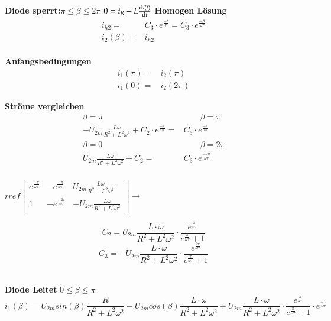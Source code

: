 \textbf{Diode sperrt:}$ \pi \leq \beta \leq 2\pi$\newline
$0 = i_R + L\frac{\mathop{}\!\mathrm{d} i(t)}{\mathop{}\!\mathrm{d} t}$\newline
\textbf{Homogen Lösung}
\begin{align*}
i_{h2} = & C_3 \cdot e^{\frac{-t}{\tau}} = C_3 \cdot e^{\frac{-\beta}{\omega \tau}}\\
i_2(\beta) = & i_{h2}
\end{align*}
\\
\textbf{Anfangsbedingungen}
\begin{align*}
    i_1(\pi) = & i_2(\pi)\\
    i_1(0)  = & i_2(2\pi)
\end{align*}

\textbf{Ströme vergleichen}
\begin{align*}
    \beta = \pi \qquad & \qquad \beta = \pi\\
    - U_{2m} \frac{L\omega}{R^2 + L^2\omega^2} + C_2 \cdot e^{\frac{-\pi}{\omega \tau}} = & C_3 \cdot e^{\frac{-\pi}{\omega \tau}}\\
    \beta = 0 \qquad & \qquad \beta = 2\pi\\
    U_{2m} \frac{L\omega}{R^2 + L^2\omega^2} + C_2  = & C_3 \cdot e^{\frac{-2\pi}{\omega \tau}}\\  
\end{align*}
\begin{minipage}{7cm}
    $rref
    \begin{bmatrix}
    e^{\frac{-\pi}{\omega \tau}}       &-e^{\frac{-\pi}{\omega \tau}}  & U_{2m} \frac{L\omega}{R^2 + L^2\omega^2} \\ 
    1& -e^{\frac{-2\pi}{\omega \tau}}         & -U_{2m} \frac{L\omega}{R^2 + L^2\omega^2}
    \end{bmatrix} 
    \rightarrow$ 
\end{minipage}
\begin{minipage}{5cm}
    \[ C_2 = U_{2m} \frac{L \cdot \omega}{R^2 + L^2\omega^2} \cdot  \frac{e^{\frac{\pi}{\omega \tau}}}{e^{\frac{\pi}{\omega \tau}} +1} \]
    \[ C_3 = -U_{2m} \frac{L \cdot \omega}{R^2 + L^2\omega^2} \cdot  \frac{e^{\frac{2\pi}{\omega \tau}}}{e^{\frac{\pi}{\omega \tau}} +1} \]
\end{minipage}
\\
\textbf{Diode Leitet} $ 0 \leq \beta \leq \pi $\newline
\[ i_{1}(\beta) =  U_{2m} sin(\beta) \frac{R}{R^2 + L^2\omega^2} - U_{2m} cos(\beta) \frac{L \cdot \omega}{R^2 + L^2\omega^2} + U_{2m} \frac{L \cdot \omega}{R^2 + L^2\omega^2} \cdot  \frac{e^{\frac{\pi}{\omega \tau}}}{e^{\frac{\pi}{\omega \tau}} +1} \cdot e^{\frac{-\beta}{\omega \tau}} \]

